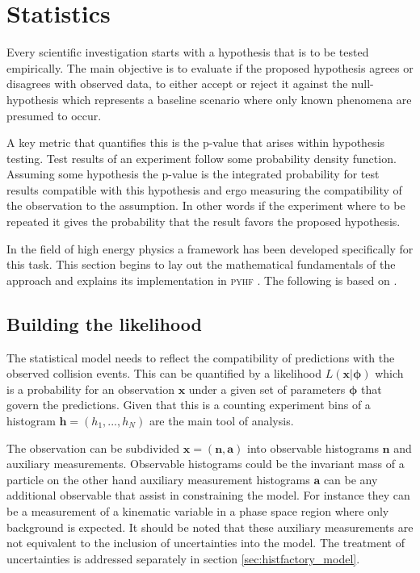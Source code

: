 \chapter{Statistics}\label{sec:statistics}

Every scientific investigation starts with a hypothesis that is to be tested empirically. The main objective is to evaluate if the proposed hypothesis agrees or disagrees with observed data, to either accept or reject it against the null-hypothesis which represents a baseline scenario where only known phenomena are presumed to occur. 

A key metric that quantifies this is the p-value that arises within hypothesis testing. Test results of an experiment follow some probability density function. Assuming some hypothesis the p-value is the integrated probability for test results compatible with this hypothesis and ergo measuring the compatibility of the observation to the assumption. In other words if the experiment where to be repeated it gives the probability that the result favors the proposed hypothesis.

In the field of high energy physics a framework has been developed specifically for this task. This section begins to lay out the mathematical fundamentals of the approach and explains its implementation in \textsc{pyhf} \citep{pyhf,pyhf_joss}. The following is based on \citep{cowan2011asymptotic,behnke2013data,pyhf}.
 
\section{Building the likelihood}\label{sec:likelihood}
The statistical model needs to reflect the compatibility of predictions with the observed collision events. This can be quantified by a likelihood $L(\bm{x} | \bm{\phi})$ which is a probability for an observation $\bm{x}$ under a given set of parameters $\bm{\phi}$ that govern the predictions. Given that this is a counting experiment bins of a histogram $\bm{h}=(h_1,...,h_N)$ are the main tool of analysis.

The observation can be subdivided $\bm{x}=(\bm{n},\bm{a})$ into observable histograms $\bm{n}$ and auxiliary measurements. Observable histograms could be the invariant mass of a particle on the other hand auxiliary measurement histograms $\bm{a}$ can be any additional observable that assist in constraining the model. For instance they can be a measurement of a kinematic variable in a phase space region where only background is expected. It should be noted that these auxiliary measurements are not equivalent to the inclusion of uncertainties into the model. The treatment of uncertainties is addressed separately in section \ref{sec:histfactory_model}. 

